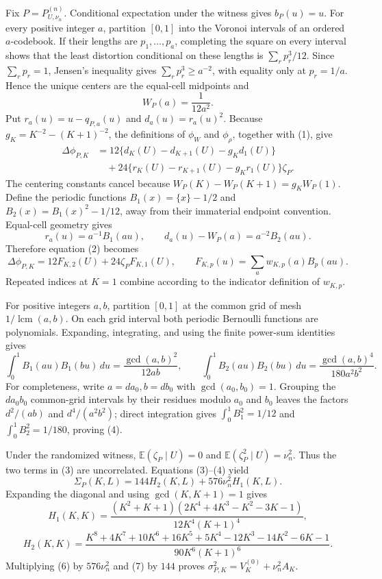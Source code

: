 Fix \(P=P_{U,\nu_n}^{(n)}\).  Conditional expectation under the witness gives \(b_P(u)=u\).  For every positive integer \(a\), partition \([0,1]\) into the Voronoi intervals of an ordered \(a\)-codebook.  If their lengths are \(p_1,\ldots,p_a\), completing the square on every interval shows that the least distortion conditional on these lengths is \(\sum_rp_r^3/12\).  Since \(\sum_rp_r=1\), Jensen's inequality gives \(\sum_rp_r^3\geq a^{-2}\), with equality only at \(p_r=1/a\).  Hence the unique centers are the equal-cell midpoints and
\[
 W_P(a)=\frac1{12a^2}.                                                        \tag{1}
\]
Put \(r_a(u)=u-q_{P,a}(u)\) and \(d_a(u)=r_a(u)^2\).  Because \(g_K=K^{-2}-(K+1)^{-2}\), the definitions of \(\phi_W\) and \(\phi_\rho\), together with (1), give
\[
 \begin{aligned}
 \Delta\phi_{P,K}
 &=12\{d_K(U)-d_{K+1}(U)-g_Kd_1(U)\}\\
 &\quad+24\{r_K(U)-r_{K+1}(U)-g_Kr_1(U)\}\zeta_P.
 \end{aligned}                                                           \tag{2}
\]
The centering constants cancel because \(W_P(K)-W_P(K+1)=g_KW_P(1)\).  Define the periodic functions \(B_1(x)=\{x\}-1/2\) and \(B_2(x)=B_1(x)^2-1/12\), away from their immaterial endpoint convention.  Equal-cell geometry gives
\[
 r_a(u)=a^{-1}B_1(au),
 \qquad d_a(u)-W_P(a)=a^{-2}B_2(au).
\]
Therefore equation (2) becomes
\[
 \Delta\phi_{P,K}=12F_{K,2}(U)+24\zeta_PF_{K,1}(U),
 \qquad F_{K,p}(u)=\sum_aw_{K,p}(a)B_p(au).                              \tag{3}
\]
Repeated indices at \(K=1\) combine according to the indicator definition of \(w_{K,p}\).

For positive integers \(a,b\), partition \([0,1]\) at the common grid of mesh \(1/\operatorname{lcm}(a,b)\).  On each grid interval both periodic Bernoulli functions are polynomials.  Expanding, integrating, and using the finite power-sum identities gives
\[
 \int_0^1B_1(au)B_1(bu)\,du=\frac{\gcd(a,b)^2}{12ab},
 \qquad
 \int_0^1B_2(au)B_2(bu)\,du=\frac{\gcd(a,b)^4}{180a^2b^2}.              \tag{4}
\]
For completeness, write \(a=da_0,b=db_0\) with \(\gcd(a_0,b_0)=1\).  Grouping the \(da_0b_0\) common-grid intervals by their residues modulo \(a_0\) and \(b_0\) leaves the factors \(d^2/(ab)\) and \(d^4/(a^2b^2)\); direct integration gives \(\int_0^1B_1^2=1/12\) and \(\int_0^1B_2^2=1/180\), proving (4).

Under the randomized witness, \(\mathbb E(\zeta_P\mid U)=0\) and \(\mathbb E(\zeta_P^2\mid U)=\nu_n^2\).  Thus the two terms in (3) are uncorrelated.  Equations (3)--(4) yield
\[
 \Sigma_P(K,L)=144H_2(K,L)+576\nu_n^2H_1(K,L).                           \tag{5}
\]
Expanding the diagonal and using \(\gcd(K,K+1)=1\) gives
\[
 H_1(K,K)=\frac{(K^2+K+1)(2K^4+4K^3-K^2-3K-1)}{12K^4(K+1)^4},           \tag{6}
\]
\[
 H_2(K,K)=\frac{K^8+4K^7+10K^6+16K^5+5K^4-12K^3-14K^2-6K-1}
 {90K^6(K+1)^6}.                                                         \tag{7}
\]
Multiplying (6) by \(576\nu_n^2\) and (7) by \(144\) proves
\(\sigma_{P,K}^2=V_K^{(0)}+\nu_n^2A_K\).

